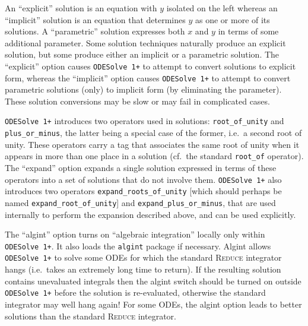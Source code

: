 \documentclass[a4paper]{article} %
\newcommand{\ODESolve}[1]{\texttt{ODESolve\,#1}}
\newcommand{\REDUCE}{\textsc{Reduce}}
\begin{document}
An ``explicit'' solution is an equation with $y$ isolated on the left
whereas an ``implicit'' solution is an equation that determines $y$ as
one or more of its solutions.  A ``parametric'' solution expresses
both $x$ and $y$ in terms of some additional parameter.  Some solution
techniques naturally produce an explicit solution, but some produce
either an implicit or a parametric solution.  The ``explicit'' option
causes \ODESolve{1+} to attempt to convert solutions to explicit form,
whereas the ``implicit'' option causes \ODESolve{1+} to attempt to
convert parametric solutions (only) to implicit form (by eliminating
the parameter).  These solution conversions may be slow or may fail in
complicated cases.

\ODESolve{1+} introduces two operators used in solutions:
\texttt{root\_of\_unity} and \texttt{plus\_or\_minus}, the latter
being a special case of the former, i.e.\ a second root of unity.
These operators carry a tag that associates the same root of unity
when it appears in more than one place in a solution (cf.\ the
standard \texttt{root\_of} operator).  The ``expand'' option expands a
single solution expressed in terms of these operators into a set of
solutions that do not involve them.  \ODESolve{1+} also introduces two
operators \texttt{expand\_roots\_of\_unity} [which should perhaps be
named \texttt{expand\_root\_of\_unity}] and
\texttt{expand\_plus\_or\_minus}, that are used internally to perform
the expansion described above, and can be used explicitly.

The ``algint'' option turns on ``algebraic integration'' locally only
within \ODESolve{1+}.  It also loads the \texttt{algint} package if
necessary.  Algint allows \ODESolve{1+} to solve some ODEs for which
the standard \REDUCE{} integrator hangs (i.e.\ takes an extremely long
time to return).  If the resulting solution contains unevaluated
integrals then the algint switch should be turned on outside
\ODESolve{1+} before the solution is re-evaluated, otherwise the
standard integrator may well hang again!  For some ODEs, the algint
option leads to better solutions than the standard \REDUCE{}
integrator.
\end{document}
